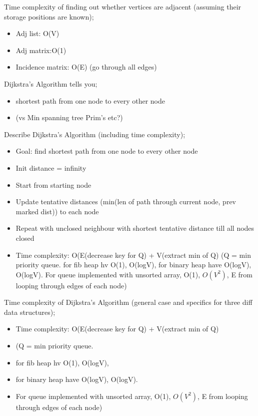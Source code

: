 \documentclass{article}
\begin{document}
Time complexity of finding out whether vertices are adjacent (assuming their storage positions are known); \begin{itemize} \item Adj list: O(V) \item Adj matrix:O(1) \item Incidence matrix: O(E) (go through all edges) \end{itemize} 

Dijkstra's Algorithm tells you; \begin{itemize} \item shortest path from one node to every other node \item (vs Min spanning tree Prim's etc?) \end{itemize}

Describe Dijkstra's Algorithm (including time complexity); \begin{itemize} \item Goal: find shortest path from one node to every other node \item Init distance = infinity \item Start from starting node \item Update tentative distances (min(len of path through current node, prev marked dist)) to each node \item Repeat with unclosed neighbour with shortest tentative distance till all nodes closed \item Time complexity: O(E(decrease key for Q) + V(extract min of Q) (Q = min priority queue. for fib heap hv  O(1), O(logV), for binary heap have O(logV), O(logV). For queue implemented with unsorted array, O(1), $O(V^2)$, E from looping through edges of each node) \end{itemize}

Time complexity of Dijkstra's Algorithm (general case and specifics for three diff data structures); \begin{itemize} \item Time complexity: O(E(decrease key for Q) + V(extract min of Q) \item (Q = min priority queue. \item for fib heap hv  O(1), O(logV), \item for binary heap have O(logV), O(logV). \item For queue implemented with unsorted array, O(1), $O(V^2)$, E from looping through edges of each node) \end{itemize}
\end{document}

